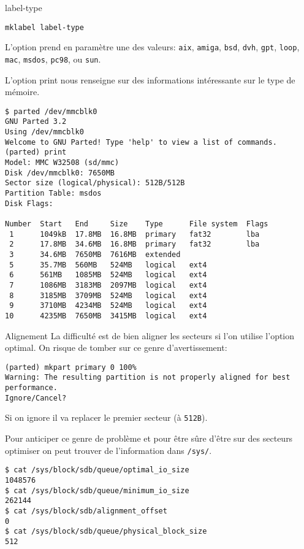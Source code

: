 \documentclass[compress]{beamer}
\begin{document}
\begin{frame}[fragile]{label-type}
\begin{lstlisting}[style=shell]
mklabel label-type
\end{lstlisting}
L'option prend en paramètre une des valeurs:\newline
\texttt{aix}, \texttt{amiga}, \texttt{bsd}, \texttt{dvh}, \texttt{gpt}, \texttt{loop}, \texttt{mac}, \texttt{msdos}, \texttt{pc98}, ou \texttt{sun}.
\end{frame}

\begin{frame}[fragile]
L'option print nous renseigne sur des informations intéressante sur le type de mémoire.
\begin{lstlisting}[style=shell,basicstyle=\tiny\ttfamily\color{white}]
$ parted /dev/mmcblk0
GNU Parted 3.2
Using /dev/mmcblk0
Welcome to GNU Parted! Type 'help' to view a list of commands.
(parted) print                                                            
Model: MMC W32508 (sd/mmc)
Disk /dev/mmcblk0: 7650MB
Sector size (logical/physical): 512B/512B
Partition Table: msdos
Disk Flags: 

Number  Start   End     Size    Type      File system  Flags
 1      1049kB  17.8MB  16.8MB  primary   fat32        lba
 2      17.8MB  34.6MB  16.8MB  primary   fat32        lba
 3      34.6MB  7650MB  7616MB  extended
 5      35.7MB  560MB   524MB   logical   ext4
 6      561MB   1085MB  524MB   logical   ext4
 7      1086MB  3183MB  2097MB  logical   ext4
 8      3185MB  3709MB  524MB   logical   ext4
 9      3710MB  4234MB  524MB   logical   ext4
10      4235MB  7650MB  3415MB  logical   ext4
\end{lstlisting}
\end{frame}

\begin{frame}[fragile]{Alignement}
La difficulté est de bien aligner les secteurs si l'on utilise l'option optimal.\newline
On risque de tomber sur ce genre d'avertissement:
\begin{lstlisting}[style=shell]
(parted) mkpart primary 0 100%
Warning: The resulting partition is not properly aligned for best performance.
Ignore/Cancel?
\end{lstlisting}
Si on ignore il va replacer le premier secteur (à \texttt{512B}).
\end{frame}

\begin{frame}[fragile]
Pour anticiper ce genre de problème et pour être sûre d'être sur des secteurs optimiser on peut trouver de l'information dans \texttt{/sys/}.
\begin{lstlisting}[style=shell]
$ cat /sys/block/sdb/queue/optimal_io_size
1048576
$ cat /sys/block/sdb/queue/minimum_io_size
262144
$ cat /sys/block/sdb/alignment_offset
0
$ cat /sys/block/sdb/queue/physical_block_size
512
\end{lstlisting}
\end{frame}
\end{document}
